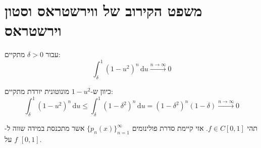 \documentclass{tstextbook}
\begin{document}
\section{משפט הקירוב של ווירשטראס וסטון וירשטראס}

\begin{lemma}
עבור \(\delta> 0\) מתקיים:
$$\int_{\delta}^{1} (1-u^{2})^{n} \, \mathrm{d}u\xrightarrow{n\to \infty} 0  $$

\end{lemma}
כיוון ש-\(1-u^{2}\) מונוטונית יורדת מתקיים:
$$\int_{\delta}^{1} (1-u^{2})^{n} \, \mathrm{d}u\leq  \int_{\delta}^{1} (1-\delta^{2})^{n} \, \mathrm{d}u=(1-\delta^{2})^{n}(1-\delta)\xrightarrow{n\to \infty} 0 $$

\begin{theorem}
תהי \(f \in C[0,1]\). אזי קיימת סדרת פולינומים \(\{ p_{n}(x) \}_{n=1}^{\infty}\) אשר מתכנסת במידה שווה ל-\(f\) על \([0,1]\).

\end{theorem}
\end{document}

